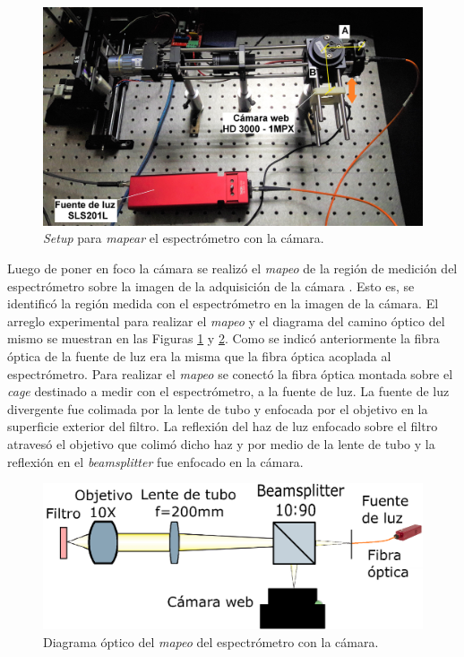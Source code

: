 \begin{figure}[H]
	\centering
	\includegraphics[width=1.0\textwidth]{Figs/microespectrometro/mapespeccam.jpg}
	\caption{\textit{Setup} para \textit{mapear} el espectrómetro con la cámara.}
	\label{fig:modmanualcam}
\end{figure}

Luego de poner en foco la cámara se realizó el \textit{mapeo} de la región de medición del espectrómetro sobre la imagen de la adquisición de la cámara \cite{frise}. Esto es, se identificó la región medida con el espectrómetro en la imagen de la cámara. El arreglo experimental para realizar el \textit{mapeo} y el diagrama del camino óptico del mismo se muestran en las Figuras \ref{fig:modmanualcam} y \ref{fig:caminmapp}. Como se indicó anteriormente la fibra óptica de la fuente de luz era la misma que la fibra óptica acoplada al espectrómetro. Para realizar el \textit{mapeo} se conectó la fibra óptica montada sobre el \textit{cage} destinado a medir con el espectrómetro, a la fuente de luz. La fuente de luz divergente fue colimada por la lente de tubo y enfocada por el objetivo en la superficie exterior del filtro. La reflexión del haz de luz enfocado sobre el filtro atravesó el objetivo que colimó dicho haz y por medio de la lente de tubo y la reflexión en el \textit{beamsplitter} fue enfocado en la cámara.

\begin{figure}[H]
	\centering
	\includegraphics[scale=0.25]{Figs/microespectrometro/diagopticomapcamspec.png}
	\caption{Diagrama óptico del \textit{mapeo} del espectrómetro con la cámara.}
	\label{fig:caminmapp}
\end{figure}

